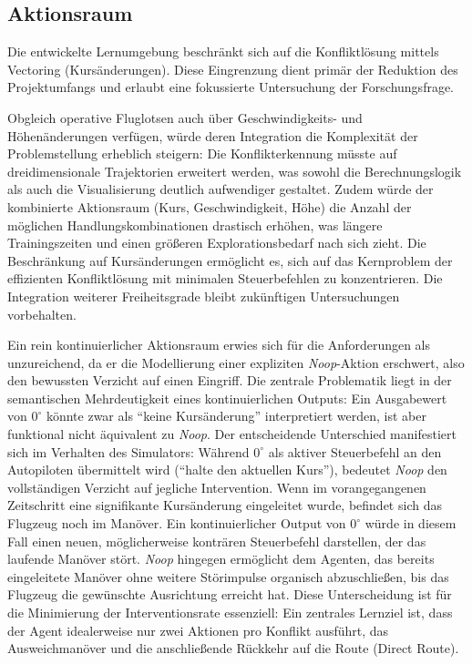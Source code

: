 \subsection{Aktionsraum}
\label{sc:aktionsraum}
Die entwickelte Lernumgebung beschränkt sich auf die Konfliktlösung mittels Vectoring (Kursänderungen). 
Diese Eingrenzung dient primär der Reduktion des Projektumfangs und erlaubt eine fokussierte Untersuchung der Forschungsfrage.
\medskip

Obgleich operative Fluglotsen auch über Geschwindigkeits- und Höhenänderungen verfügen, würde deren Integration die Komplexität der Problemstellung erheblich steigern:
Die Konflikterkennung müsste auf dreidimensionale Trajektorien erweitert werden, was sowohl die Berechnungslogik als auch die Visualisierung deutlich aufwendiger gestaltet.
Zudem würde der kombinierte Aktionsraum (Kurs, Geschwindigkeit, Höhe) die Anzahl der möglichen Handlungskombinationen drastisch erhöhen, was längere Trainingszeiten und einen größeren Explorationsbedarf nach sich zieht.
Die Beschränkung auf Kursänderungen ermöglicht es, sich auf das Kernproblem der effizienten Konfliktlösung mit minimalen Steuerbefehlen zu konzentrieren.
Die Integration weiterer Freiheitsgrade bleibt zukünftigen Untersuchungen vorbehalten.
\medskip

Ein rein kontinuierlicher Aktionsraum erwies sich für die Anforderungen als unzureichend, da er die Modellierung einer expliziten \emph{Noop}-Aktion erschwert, also den bewussten Verzicht auf einen Eingriff. 
Die zentrale Problematik liegt in der semantischen Mehrdeutigkeit eines kontinuierlichen Outputs: Ein Ausgabewert von $0^\circ$ könnte zwar als \enquote{keine Kursänderung} interpretiert werden, ist aber funktional nicht äquivalent zu \emph{Noop}.
Der entscheidende Unterschied manifestiert sich im Verhalten des Simulators: Während $0^\circ$ als aktiver Steuerbefehl an den Autopiloten übermittelt wird (\enquote{halte den aktuellen Kurs}), bedeutet \emph{Noop} den vollständigen Verzicht auf jegliche Intervention.
Wenn im vorangegangenen Zeitschritt eine signifikante Kursänderung eingeleitet wurde, befindet sich das Flugzeug noch im Manöver.
Ein kontinuierlicher Output von $0^\circ$ würde in diesem Fall einen neuen, möglicherweise konträren Steuerbefehl darstellen, der das laufende Manöver stört. 
\emph{Noop} hingegen ermöglicht dem Agenten, das bereits eingeleitete Manöver ohne weitere Störimpulse organisch abzuschließen, bis das Flugzeug die gewünschte Ausrichtung erreicht hat.
Diese Unterscheidung ist für die Minimierung der Interventionsrate essenziell: Ein zentrales Lernziel ist, dass der Agent idealerweise nur zwei Aktionen pro Konflikt ausführt, das Ausweichmanöver und die anschließende Rückkehr auf die Route (Direct Route).
\medskip

